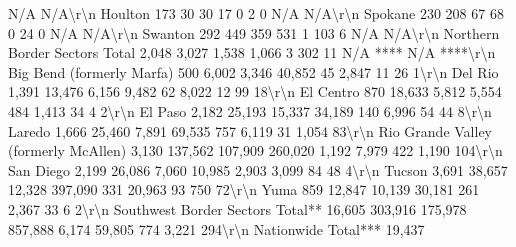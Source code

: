 \documentclass[
  12pt,
]{book}
\newenvironment{Shaded}{\begin{snugshade}}{\end{snugshade}}
\begin{document}
\begin{Shaded}
\begin{Highlighting}[]
       N/A     N/A\textbackslash{}r\textbackslash{}n Houlton                                           173                 30                       30                      17                0                2               0           N/A     N/A\textbackslash{}r\textbackslash{}n Spokane                                           230                208                       67                      68                0               24               0           N/A     N/A\textbackslash{}r\textbackslash{}n Swanton                                           292                449                      359                     531                1              103               6           N/A     N/A\textbackslash{}r\textbackslash{}n Northern Border Sectors Total                    2,048              3,027                    1,538                   1,066               3              302              11        N/A **** N/A ****\textbackslash{}r\textbackslash{}n Big Bend (formerly Marfa)                         500               6,002                   3,346                   40,852              45             2,847             11            26      1\textbackslash{}r\textbackslash{}n Del Rio                                          1,391             13,476                    6,156                   9,482              62             8,022             12            99     18\textbackslash{}r\textbackslash{}n El Centro                                         870              18,633                    5,812                   5,554             484             1,413             34             4      2\textbackslash{}r\textbackslash{}n El Paso                                          2,182             25,193                   15,337                  34,189             140             6,996             54            44      8\textbackslash{}r\textbackslash{}n Laredo                                           1,666             25,460                    7,891                  69,535             757             6,119             31          1,054    83\textbackslash{}r\textbackslash{}n Rio Grande Valley (formerly McAllen)             3,130            137,562                  107,909                260,020             1,192            7,979            422          1,190   104\textbackslash{}r\textbackslash{}n San Diego                                        2,199             26,086                    7,060                  10,985            2,903            3,099             84            48      4\textbackslash{}r\textbackslash{}n Tucson                                           3,691             38,657                   12,328                397,090              331            20,963             93           750     72\textbackslash{}r\textbackslash{}n Yuma                                              859              12,847                   10,139                  30,181             261             2,367             33             6      2\textbackslash{}r\textbackslash{}n Southwest Border Sectors Total**                16,605            303,916                  175,978                857,888             6,174           59,805            774          3,221   294\textbackslash{}r\textbackslash{}n Nationwide Total***                             19,437      
\end{Highlighting}
\end{Shaded}
\end{document}
